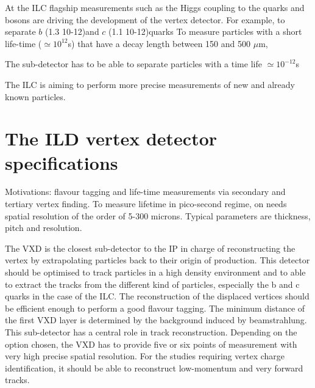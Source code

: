   At the \gls{ILC} flagship measurements such as the Higgs coupling to the quarks and bosons are driving the development of the vertex detector.
  For example, to separate $b$ (1.3 10-12)and $c$ (1.1 10-12)quarks
  To measure particles with a short life-time ($\simeq 10^{12}$s) that have a decay length between 150 and 500 $\mu$m, 


  The sub-detector has to be able to separate particles with a time life $\simeq 10^{-12}$s  


  The \gls{ILC} is aiming to perform more precise measurements of new and already known particles. 

  \minitoc
  
  \section{The ILD vertex detector specifications}
   





    Motivations: flavour tagging and life-time measurements via secondary and tertiary vertex finding. 
    To measure lifetime in pico-second regime, on needs spatial resolution of the order of 5-300 microns.
    Typical parameters are thickness, pitch and resolution.
    

    The \gls{VXD} is the closest sub-detector to the \gls{IP} in charge of reconstructing the vertex by extrapolating particles back to their origin of production. 
    This detector should be optimised to track particles in a high density environment and to able to extract the tracks from the different kind of particles, especially the b and c quarks in the case of the \gls{ILC}.
    The reconstruction of the displaced vertices should be efficient enough to perform a good flavour tagging.
    The minimum distance of the first \gls{VXD} layer is determined by the background induced by beamstrahlung.
    This sub-detector has a central role in track reconstruction.
    Depending on the option chosen, the \gls{VXD} has to provide five or six points of measurement with very high precise spatial resolution.
    For the studies requiring vertex charge identification, it should be able to reconstruct low-momentum and very forward tracks.
   

